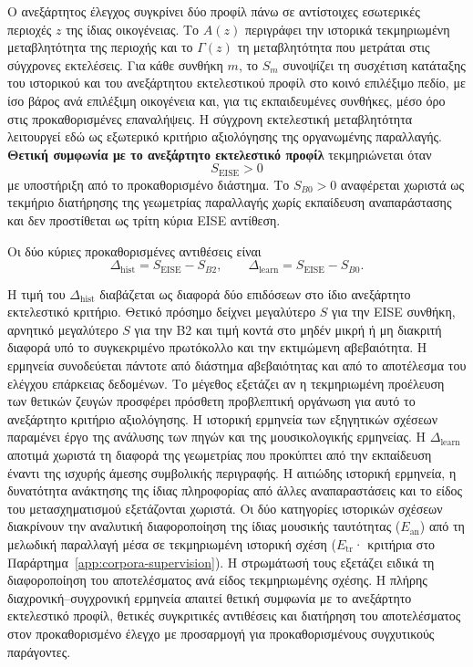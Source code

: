 \documentclass[11pt,a4paper]{article}
\begin{document}
Ο ανεξάρτητος έλεγχος συγκρίνει δύο προφίλ πάνω σε αντίστοιχες εσωτερικές περιοχές $z$ της ίδιας οικογένειας. Το $A(z)$ περιγράφει την ιστορικά τεκμηριωμένη μεταβλητότητα της περιοχής και το $\Gamma(z)$ τη μεταβλητότητα που μετράται στις σύγχρονες εκτελέσεις. Για κάθε συνθήκη $m$, το $S_m$ συνοψίζει τη συσχέτιση κατάταξης του ιστορικού και του ανεξάρτητου εκτελεστικού προφίλ στο κοινό επιλέξιμο πεδίο, με ίσο βάρος ανά επιλέξιμη οικογένεια και, για τις εκπαιδευμένες συνθήκες, μέσο όρο στις προκαθορισμένες επαναλήψεις. Η σύγχρονη εκτελεστική μεταβλητότητα λειτουργεί εδώ ως εξωτερικό κριτήριο αξιολόγησης της οργανωμένης παραλλαγής. \textbf{Θετική συμφωνία με το ανεξάρτητο εκτελεστικό προφίλ} τεκμηριώνεται όταν
\[
S_{\mathrm{EISE}}>0
\]
με υποστήριξη από το προκαθορισμένο διάστημα. Το $S_{B0}>0$ αναφέρεται χωριστά ως τεκμήριο διατήρησης της γεωμετρίας παραλλαγής χωρίς εκπαίδευση αναπαράστασης και δεν προστίθεται ως τρίτη κύρια EISE αντίθεση.

Οι δύο κύριες προκαθορισμένες αντιθέσεις είναι
\[
\Delta_{\mathrm{hist}}=S_{\mathrm{EISE}}-S_{B2},
\qquad
\Delta_{\mathrm{learn}}=S_{\mathrm{EISE}}-S_{B0}.
\]

Η τιμή του $\Delta_{\mathrm{hist}}$ διαβάζεται ως διαφορά δύο επιδόσεων στο ίδιο ανεξάρτητο εκτελεστικό κριτήριο. Θετικό πρόσημο δείχνει μεγαλύτερο $S$ για την EISE συνθήκη, αρνητικό μεγαλύτερο $S$ για την B2 και τιμή κοντά στο μηδέν μικρή ή μη διακριτή διαφορά υπό το συγκεκριμένο πρωτόκολλο και την εκτιμώμενη αβεβαιότητα. Η ερμηνεία συνοδεύεται πάντοτε από διάστημα αβεβαιότητας και από το αποτέλεσμα του ελέγχου επάρκειας δεδομένων. Το μέγεθος εξετάζει αν η τεκμηριωμένη προέλευση των θετικών ζευγών προσφέρει πρόσθετη προβλεπτική οργάνωση για αυτό το ανεξάρτητο κριτήριο αξιολόγησης. Η ιστορική ερμηνεία των εξηγητικών σχέσεων παραμένει έργο της ανάλυσης των πηγών και της μουσικολογικής ερμηνείας.
Η $\Delta_{\mathrm{learn}}$ αποτιμά χωριστά τη διαφορά της γεωμετρίας που προκύπτει από την εκπαίδευση έναντι της ισχυρής άμεσης συμβολικής περιγραφής. Η αιτιώδης ιστορική ερμηνεία, η δυνατότητα ανάκτησης της ίδιας πληροφορίας από άλλες αναπαραστάσεις και το είδος του μετασχηματισμού εξετάζονται χωριστά. Οι δύο κατηγορίες ιστορικών σχέσεων διακρίνουν την αναλυτική διαφοροποίηση της ίδιας μουσικής ταυτότητας ($E_{\mathrm{an}}$) από τη μελωδική παραλλαγή μέσα σε τεκμηριωμένη ιστορική σχέση ($E_{\mathrm{tr}}$· κριτήρια στο Παράρτημα~\ref{app:corpora-supervision}). Η στρωμάτωσή τους εξετάζει ειδικά τη διαφοροποίηση του αποτελέσματος ανά είδος τεκμηριωμένης σχέσης. Η πλήρης διαχρονική--συγχρονική ερμηνεία απαιτεί θετική συμφωνία με το ανεξάρτητο εκτελεστικό προφίλ, θετικές συγκριτικές αντιθέσεις και διατήρηση του αποτελέσματος στον προκαθορισμένο έλεγχο με προσαρμογή για προκαθορισμένους συγχυτικούς παράγοντες.
\end{document}
